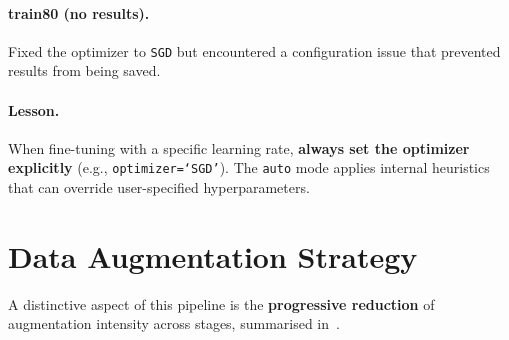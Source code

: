 \documentclass[11pt, a4paper]{article}
\begin{document}
\paragraph{train80 (no results).}  Fixed the optimizer to \texttt{SGD} but encountered a configuration issue that
prevented results from being saved.

\paragraph{Lesson.}  When fine-tuning with a specific learning rate, \textbf{always set the
  optimizer explicitly} (e.g., \texttt{optimizer=`SGD'}). The \texttt{auto} mode
applies internal heuristics that can override user-specified hyperparameters.

\section{Data Augmentation Strategy}
\label{sec:augmentation}

A distinctive aspect of this pipeline is the \textbf{progressive reduction} of
augmentation intensity across stages, summarised in~.
\end{document}
